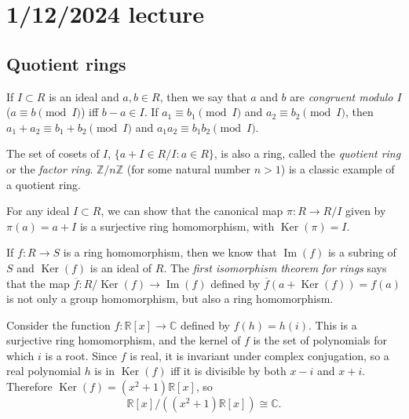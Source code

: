 \documentclass[12pt]{article}
\begin{document}
\section{1/12/2024 lecture}
\subsection{Quotient rings}
If $I \subset R$ is an ideal and $a, b \in R$, then we say that $a$ and $b$ are \textit{congruent modulo $I$} ($a \equiv b \pmod{I}$) iff $b-a \in I$. If $a_1 \equiv b_1 \pmod{I}$ and $a_2 \equiv b_2 \pmod{I}$, then $a_1 + a_2 \equiv b_1 + b_2 \pmod{I}$ and $a_1a_2 \equiv b_1b_2 \pmod{I}$.
\par
The set of cosets of $I$, $\{a+I\in R/I:a\in R\}$, is also a ring, called the \textit{quotient ring} or the \textit{factor ring}. $ \mathbb{Z}/n \mathbb{Z}$ (for some natural number $n>1$) is a classic example of a quotient ring.
\par
For any ideal $I \subset R$, we can show that the canonical map $\pi: R \rightarrow R/I$ given by $\pi(a)=a+I$ is a surjective ring homomorphism, with $\operatorname{Ker}(\pi)=I$.
\par
If $f: R \rightarrow S$ is a ring homomorphism, then we know that $\operatorname{Im}(f)$ is a subring of $S$ and $\operatorname{Ker}(f)$ is an ideal of $R$. The \textit{first isomorphism theorem for rings} says that the map $\overline{f}:R/\operatorname{Ker}(f) \rightarrow \operatorname{Im}(f)$ defined by $\overline{f}(a+\operatorname{Ker}(f))=f(a)$ is not only a group homomorphism, but also a ring homomorphism.
\par
Consider the function $f: \mathbb{R}[x] \rightarrow \mathbb{C}$ defined by $f(h)=h(i)$. This is a surjective ring homomorphism, and the kernel of $f$ is the set of polynomials for which $i$ is a root. Since $f$ is real, it is invariant under complex conjugation, so a real polynomial $h$ is in $\operatorname{Ker}(f)$ iff it is divisible by both $x-i$ and $x+i$. Therefore $\operatorname{Ker}(f) = (x^2 + 1) \mathbb{R}[x]$, so
\[ \mathbb{R}[x] / ((x^2 + 1) \mathbb{R}[x]) \cong \mathbb{C}. \]
\end{document}
